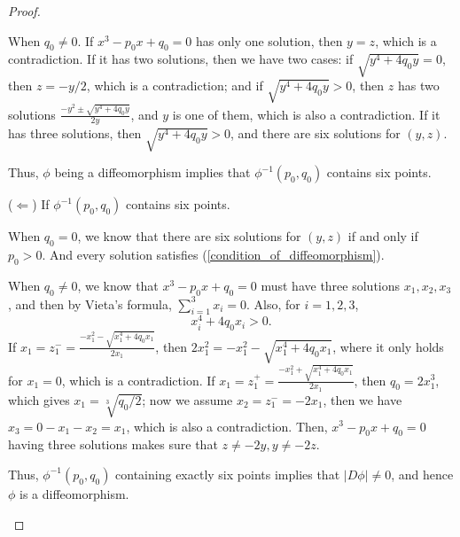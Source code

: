 \documentclass[11pt]{article}
\theoremstyle{definition}
\numberwithin{equation}{subsection}
\begin{document}
\begin{proof}
\begin{enumerate}[label=(\alph*)]
\begin{enumerate}[label=\arabic*)]
        When $q_0 \neq 0$. If $x^3 - p_0x + q_0 = 0$ has only one solution, then $y = z$, which is a contradiction. If it has two solutions, then we have two cases: if $\sqrt{y^4 + 4q_0y} = 0$, then $z = - y/2$, which is a contradiction; and if $\sqrt{y^4 + 4q_0y} > 0$, then $z$ has two solutions $\frac{-y^2 \pm \sqrt{y^4 + 4q_0y}}{2y}$, and $y$ is one of them, which is also a contradiction. If it has three solutions, then $\sqrt{y^4 + 4q_0y} > 0$, and there are six solutions for $(y,z)$.
        
        Thus, $\phi$ being a diffeomorphism implies that $\phi^{-1}(p_0, q_0)$ contains six points.
        
        ($\Leftarrow$) If $\phi^{-1}(p_0, q_0)$ contains six points.
        
        When $q_0 = 0$, we know that there are six solutions for $(y, z)$ if and only if $p_0 > 0$. And every solution satisfies (\ref{condition_of_diffeomorphism}). 
        
        When $q_0 \neq 0$, we know that $x^3 - p_0x + q_0 = 0$ must have three solutions $x_1, x_2, x_3$, and then by Vieta's formula, $\sum^3_{i=1} x_i = 0$. Also, for $i = 1,2,3$, 
        $$x_i^4 + 4 q_0 x_i > 0.$$
        If $x_1 = z_1^- = \frac{-x_1^2 - \sqrt{x_1^4 + 4q_0x_1}}{2x_1}$, then $2x_1^2 = -x_1^2 - \sqrt{x_1^4 + 4q_0x_1}$, where it only holds for $x_1 = 0$, which is a contradiction. If $x_1 = z_1^+ = \frac{-x_1^2 + \sqrt{x_1^4 + 4q_0x_1}}{2x_1}$, then $q_0 = 2x_1^3$, which gives $x_1 = \sqrt[3]{q_0/2}$; now we assume $x_2 = z_1^- = -2x_1$, then we have $x_3 = 0 - x_1 - x_2 = x_1$, which is also a contradiction. Then, $x^3 - p_0x + q_0 = 0$ having three solutions makes sure that $z \neq -2y, y \neq -2z$. 
        
        Thus, $\phi^{-1}(p_0, q_0)$ containing exactly six points implies that $|D\phi| \neq 0$, and hence $\phi$ is a diffeomorphism.
    \end{enumerate}
\end{enumerate}
\end{proof}











\newpage


\end{document}
